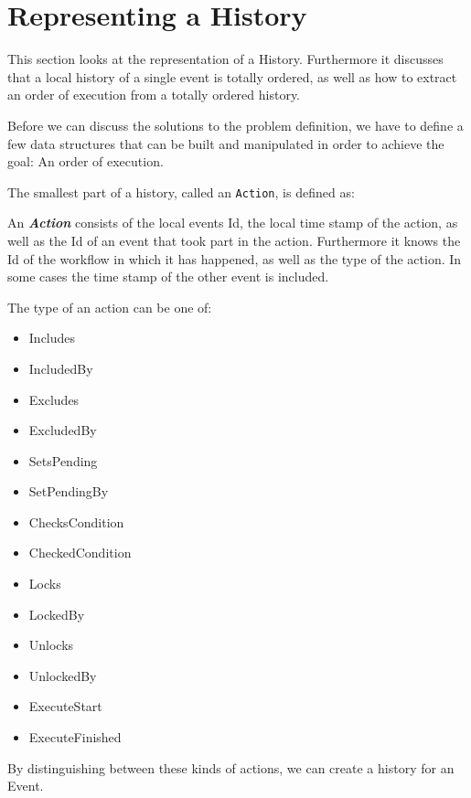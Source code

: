 \chapter{Representing a History}
	This section looks at the representation of a History. Furthermore it discusses that a local history of a single event is totally ordered, as well as how to extract an order of execution from a totally ordered history.

	\newpar Before we can discuss the solutions to the problem definition, we have to define a few data structures that can be built and manipulated in order to achieve the goal: An order of execution.
	
	\newpar The smallest part of a history, called an \texttt{Action}, is defined as:
	
	\newpar
	\begin{definition}
		An \textit{\textbf{Action}} consists of the local events Id, the local time stamp of the action, as well as the Id of an event that took part in the action. Furthermore it knows the Id of the workflow in which it has happened, as well as the type of the action. In some cases the time stamp of the other event is included.
	\end{definition}
	
	\newpar The type of an action can be one of:
	\begin{multicols}{4}
		\begin{itemize}
			\item Includes
			\item IncludedBy
			\item Excludes
			\item ExcludedBy
			\item SetsPending
			\item SetPendingBy
			\item ChecksCondition
			\item CheckedCondition
			\item Locks
			\item LockedBy
			\item Unlocks
			\item UnlockedBy
			\item ExecuteStart
			\item ExecuteFinished
		\end{itemize}
	\end{multicols}
	\noindent By distinguishing between these kinds of actions, we can create a history for an Event.
	
